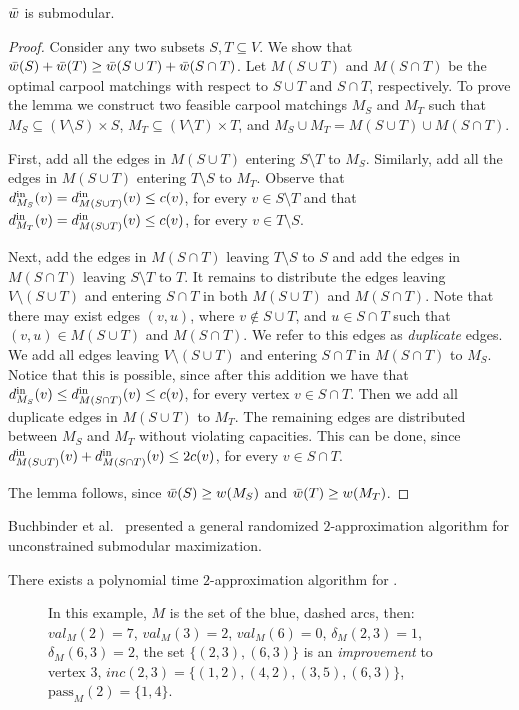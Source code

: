 \begin{lemma}
$\barw$ is submodular.
\end{lemma}
\begin{proof}
Consider any two subsets $S, T \subseteq V$.  We show that $\barw(S)
+ \barw(T) \geq \barw(S \cup T) + \barw(S \cap T)$.
%
Let $M(S \cup T)$ and $M(S \cap T)$ be the optimal carpool matchings
with respect to $S \cup T$ and $S \cap T$, respectively.
%
To prove the lemma we construct two feasible carpool matchings $M_S$
and $M_T$ such that $M_S \subseteq (V \setminus S) \times S$,
$M_T \subseteq (V \setminus T) \times T$, and $M_S \cup M_T = M(S \cup
T) \cup M(S \cap T)$.

First, add all the edges in $M(S \cup T)$ entering $S \setminus T$ to
$M_S$.  Similarly, add all the edges in $M(S \cup T)$ entering
$T \setminus S$ to $M_T$.  Observe that $\din[M_S](v) = \din[M(S \cup
T)](v) \leq c(v)$, for every $v \in S \setminus T$ and that
$\din[M_T](v) = \din[M(S \cup T)](v) \leq c(v)$, for every $v \in
T \setminus S$.

Next, add the edges in $M(S \cap T)$ leaving $T \setminus S$ to $S$
and add the edges in $M(S \cap T)$ leaving $S \setminus T$ to $T$.
%
It remains to distribute the edges leaving $V \setminus (S \cup T)$
and entering $S \cap T$ in both $M(S \cup T)$ and $M(S \cap T)$.  Note
that there may exist edges $(v,u)$, where $v \not\in S \cup T$, and
$u \in S \cap T$ such that $(v,u) \in M(S \cup T)$ and $M(S \cap T)$.
We refer to this edges as \emph{duplicate} edges.
%
We add all edges leaving $V \setminus (S \cup T)$ and entering $S \cap
T$ in $M(S \cap T)$ to $M_S$.  Notice that this is possible, since
after this addition we have that $\din[M_S](v) \leq \din[M(S \cap
T)](v) \leq c(v)$, for every vertex $v \in S \cap T$.
%
Then we add all duplicate edges in $M(S \cup T)$ to $M_T$.
%
The remaining edges are distributed between $M_S$ and $M_T$ without
violating capacities.  This can be done, since $\din[M(S \cup T)](v)
+ \din[M(S \cap T)](v) \leq 2c(v)$, for every $v \in S \cap T$.

The lemma follows, since $\barw(S) \geq w(M_S)$ and $\barw(T) \geq
w(M_T)$.
\end{proof}

Buchbinder et al.~\cite{BFNS15} presented a general randomized
$2$-approximation algorithm for unconstrained submodular maximization.

\begin{theorem}
There exists a polynomial time $2$-approximation algorithm for \carpool.
\end{theorem}

\begin{figure}
\centering

\caption[]{
\label{fig:defs}
In this example, $M$ is the set of the blue, dashed arcs, then:
$val_M(2) = 7$,
$val_M(3) = 2$,
$val_M(6) = 0$,
$\delta_M(2, 3) = 1$,
$\delta_M(6, 3) = 2$,
the set $\{(2,3), (6,3)\}$ is an \emph{improvement} to vertex 3,
$inc(2,3) = \{(1,2),(4,2),(3,5),(6,3)\}$,
$\text{pass}_M(2) = \{1, 4\}$.
}
\end{figure}
